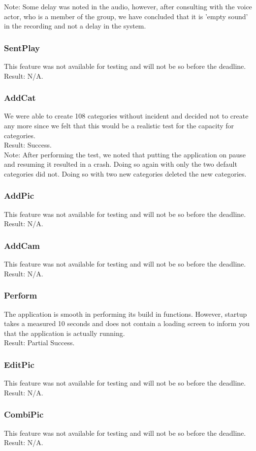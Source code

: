 Note: Some delay was noted in the audio, however, after consulting with the voice actor, who is a member of the group, we have concluded that it is 'empty sound' in the recording and not a delay in the system.

\subsubsection*{SentPlay}
This feature was not available for testing and will not be so before the deadline.\\

Result: N/A.

\subsubsection*{AddCat}
We were able to create 108 categories without incident and decided not to create any more since we felt that this would be a realistic test for the capacity for categories.\\

Result: Success.\\

Note: After performing the test, we noted that putting the application on pause and resuming it resulted in a crash. Doing so again with only the two default categories did not. Doing so with two new categories deleted the new categories.

\subsubsection*{AddPic}
This feature was not available for testing and will not be so before the deadline.\\

Result: N/A.

\subsubsection*{AddCam}
This feature was not available for testing and will not be so before the deadline.\\

Result: N/A.

\subsubsection*{Perform}
The application is smooth in performing its build in functions.
However, startup takes a measured  10 seconds and does not contain a loading screen to inform you that the application is actually running.\\

Result: Partial Success.

\subsubsection*{EditPic}
This feature was not available for testing and will not be so before the deadline.\\

Result: N/A.

\subsubsection*{CombiPic}
This feature was not available for testing and will not be so before the deadline.\\

Result: N/A.